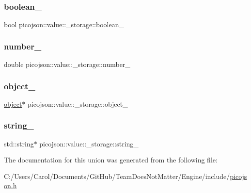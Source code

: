 \hypertarget{unionpicojson_1_1value_1_1__storage_a612a1a8ceb65bdd2e8f09eb33074ba0b}{}\label{unionpicojson_1_1value_1_1__storage_a612a1a8ceb65bdd2e8f09eb33074ba0b} 
\subsubsection{\texorpdfstring{boolean\+\_\+}{boolean\_}}
{\footnotesize\ttfamily bool picojson\+::value\+::\+\_\+storage\+::boolean\+\_\+}

\hypertarget{unionpicojson_1_1value_1_1__storage_a4fc799f222c28156f943a891e510e438}{}\label{unionpicojson_1_1value_1_1__storage_a4fc799f222c28156f943a891e510e438} 
\subsubsection{\texorpdfstring{number\+\_\+}{number\_}}
{\footnotesize\ttfamily double picojson\+::value\+::\+\_\+storage\+::number\+\_\+}

\hypertarget{unionpicojson_1_1value_1_1__storage_ad1feb283e78999609c7a27be95e5f4df}{}\label{unionpicojson_1_1value_1_1__storage_ad1feb283e78999609c7a27be95e5f4df} 
\subsubsection{\texorpdfstring{object\+\_\+}{object\_}}
{\footnotesize\ttfamily \hyperlink{classpicojson_1_1value_a7d7da11d54d7b983a902d28367bda9c1}{object}$\ast$ picojson\+::value\+::\+\_\+storage\+::object\+\_\+}

\hypertarget{unionpicojson_1_1value_1_1__storage_a9ec5aa5b86bbef81b15697c936f58736}{}\label{unionpicojson_1_1value_1_1__storage_a9ec5aa5b86bbef81b15697c936f58736} 
\subsubsection{\texorpdfstring{string\+\_\+}{string\_}}
{\footnotesize\ttfamily std\+::string$\ast$ picojson\+::value\+::\+\_\+storage\+::string\+\_\+}



The documentation for this union was generated from the following file\+:\begin{DoxyCompactItemize}
\item 
C\+:/\+Users/\+Carol/\+Documents/\+Git\+Hub/\+Team\+Does\+Not\+Matter/\+Engine/include/\hyperlink{picojson_8h}{picojson.\+h}\end{DoxyCompactItemize}
